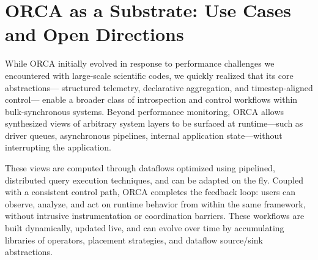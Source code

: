 \documentclass[ letterpaper, DIV=11, numbers=noendperiod]{scrartcl}
\begin{document}
%
%
%
%

\section{ORCA as a Substrate: Use Cases and Open Directions}

While ORCA initially evolved in response to performance challenges we encountered with
large-scale scientific codes, we quickly realized that its core abstractions---
structured telemetry, declarative aggregation, and timestep-aligned control---
enable a broader class of introspection and control workflows within
bulk-synchronous systems. Beyond performance monitoring, ORCA allows synthesized
views of arbitrary system layers to be surfaced at runtime---such as driver queues, asynchronous pipelines, internal application state---without interrupting the
application.

These views are computed through dataflows optimized using pipelined,
distributed query execution techniques, and can be adapted on the fly. Coupled
with a consistent control path, ORCA completes the feedback loop: users can
observe, analyze, and act on runtime behavior from within the same framework,
without intrusive instrumentation or coordination barriers. 
These workflows are built dynamically, updated live, and can evolve over time by accumulating libraries of operators, placement strategies, and dataflow source/sink abstractions.
\end{document}
